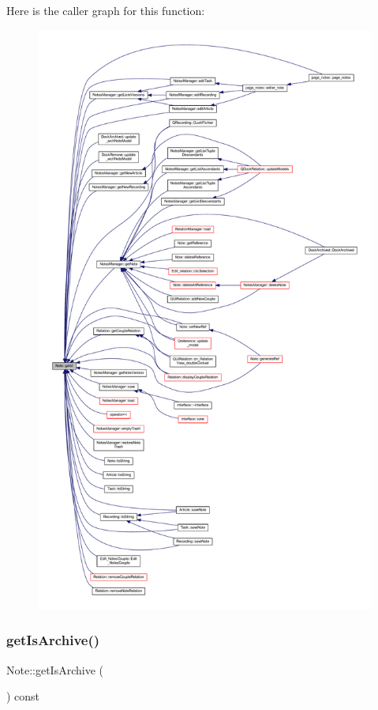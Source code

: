 Here is the caller graph for this function\+:\nopagebreak
\begin{figure}[H]
\begin{center}
\leavevmode
\includegraphics[height=550pt]{class_note_afafbebe4aa35b8d29d903bc53fa31929_icgraph}
\end{center}
\end{figure}
\mbox{\label{class_note_a3ff22c94b72b8c5cb93638bd16262d0d}} 
\subsubsection{\texorpdfstring{get\+Is\+Archive()}{getIsArchive()}}
{\footnotesize\ttfamily Note\+::get\+Is\+Archive (\begin{DoxyParamCaption}{ }\end{DoxyParamCaption}) const\hspace{0.3cm}{\ttfamily [inline]}}



